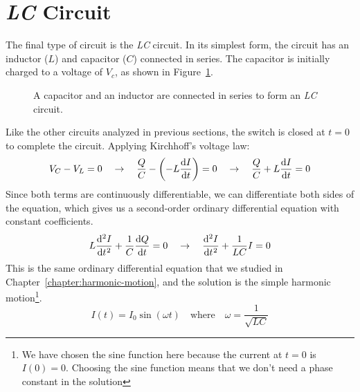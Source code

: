 \section{\emph{LC} Circuit}
The final type of circuit is the \emph{LC} circuit. In its simplest form, the
circuit has an inductor ($L$) and capacitor ($C$) connected in series. The
capacitor is initially charged to a voltage of $V_c$, as shown in
Figure~\ref{fig:LC}.
\begin{figure}[ht]
  \centering
  \caption{A capacitor and an inductor are connected in series to form an
    \emph{LC} circuit.}
  \label{fig:LC}
\end{figure}
Like the other circuits analyzed in previous sections, the switch is closed at
$t=0$ to complete the circuit. Applying Kirchhoff's voltage law:  
\begin{equation*}
  V_C-V_L=0
  \quad\rightarrow\quad
  \frac QC - \left(-L\diff It\right)=0
  \quad\rightarrow\quad
  \frac QC + L\diff It=0
\end{equation*}
Since both terms are continuously differentiable, we can differentiate both
sides of the equation, which gives us a second-order ordinary differential
equation with constant coefficients.
\begin{equation*}
  L\diff[2]It+\frac1C\diff Qt=0
  \quad\rightarrow\quad
  \diff[2]It+\frac1{LC}I=0
\end{equation*}
This is the same ordinary differential equation that we studied in
Chapter~\ref{chapter:harmonic-motion}, and the solution is the simple harmonic
motion\footnote{We have chosen the sine function here because the current at
$t=0$ is $I(0)=0$. Choosing the sine function means that we don't need a phase
constant in the solution}.
\begin{equation*}
  I(t)=I_0\sin(\omega t)\quad\text{where}\quad
  \omega=\frac1{\sqrt{LC}}
\end{equation*}
